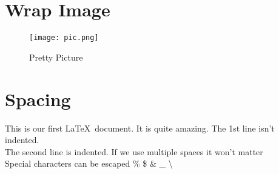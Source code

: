 \documentclass[a4paper,12pt]{book}
\begin{document}
\newpage

\section*{Wrap Image}

\begingroup

\setlength{\intextsep}{0pt}

\setlength{\columnsep}{15pt}

\begin{wrapfigure}{r}{0.45\textwidth}
\centering
  \texttt{[image: pic.png]}
  \caption{Pretty Picture}\label{fig:prettypic}
\end{wrapfigure}

\blindtext

\endgroup

\section*{Spacing}
This is our first \LaTeX\ document. It is quite amazing. The 1st line isn't indented.\\

The second line is indented. If      we     use    multiple spaces     it    won't    matter\\[10pt]

\noindent Special characters can be escaped \% \$ \& \_ \textbackslash



\end{document}
